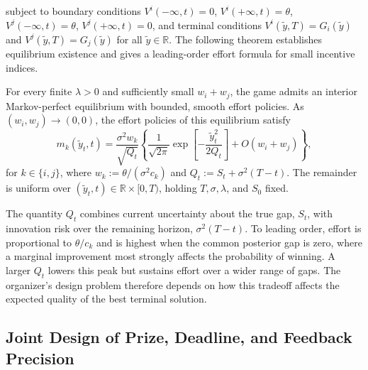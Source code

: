 \documentclass[mnsc]{informs3}
\begin{document}
subject to boundary conditions
$V^i(-\infty,t)=0$,
$V^i(+\infty,t)=\theta$,
$V^j(-\infty,t)=\theta$,
$V^j(+\infty,t)=0$,
and terminal conditions {$V^i(\tilde y,T)=G_i(\tilde y)$ and $V^j(\tilde y,T)=G_j(\tilde y)$ for all $\tilde y\in\mathbb R$.}
The following theorem establishes equilibrium existence and gives a leading-order effort formula for small incentive indices.

\begin{theorem}\label{thm-equilibrium-effort}
{For every finite $\lambda>0$ and sufficiently small $w_i+w_j$, the game admits an interior Markov-perfect equilibrium with bounded, smooth effort policies. As $(w_i,w_j)\to(0,0)$, the effort policies of this equilibrium satisfy}
\begin{equation}\label{eq-equilibrium-effort}
m_k(\tilde y_t,t)
=\frac{\sigma^2w_k}{\sqrt{Q_t}}
\left\{
\frac{1}{\sqrt{2\pi}}
\exp\!\left[-\frac{\tilde y_t^2}{2Q_t}\right]
+O(w_i+w_j)
\right\},
\end{equation}
for $k\in\{i,j\}$, where $w_k:=\theta/(\sigma^2c_k)$ and $Q_t:=S_t+\sigma^2(T-t)$. The remainder is uniform over $(\tilde y_t,t)\in\mathbb R\times[0,T)$, holding $T,\sigma,\lambda$, and $S_0$ fixed.
\end{theorem}

{The quantity $Q_t$ combines current uncertainty about the true gap, $S_t$, with innovation risk over the remaining horizon, $\sigma^2(T-t)$. To leading order, effort is proportional to $\theta/c_k$ and is highest when the common posterior gap is zero, where a marginal improvement most strongly affects the probability of winning. A larger $Q_t$ lowers this peak but sustains effort over a wider range of gaps.}
The organizer's design problem therefore depends on how this tradeoff affects the expected quality of the best terminal solution.

\subsection{{Joint Design of Prize, Deadline, and Feedback Precision}}\label{sect-design}
\end{document}
